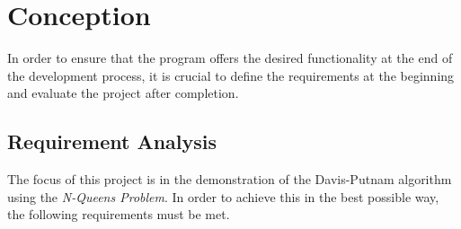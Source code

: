 \chapter{Conception}
\label{ch:conception}
In order to ensure that the program offers the desired functionality at the end of the development process, it is crucial to define the requirements at the beginning and evaluate the project after completion. 

\section{Requirement Analysis}
\label{sec:conAnalysis}
The focus of this project is in the demonstration of the Davis-Putnam algorithm using the \textit{N-Queens Problem}. In order to achieve this in the best possible way, the following requirements must be met. 

